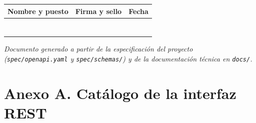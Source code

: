 \documentclass[doc,12pt,a4paper]{apa7}
\renewcommand{\arraystretch}{1.15}}
\begin{document}
\begin{center}
\renewcommand{\arraystretch}{2.2}
\begin{tabular}{|P{5.0cm}|P{5.0cm}|P{4.0cm}|}
\hline
\textbf{Nombre y puesto} & \textbf{Firma y sello} & \textbf{Fecha} \\ \hline
\rule{0pt}{1.4cm} & & \\ \hline
\rule{0pt}{1.4cm} & & \\ \hline
\rule{0pt}{1.4cm} & & \\ \hline
\rule{0pt}{1.4cm} & & \\ \hline
\rule{0pt}{1.4cm} & & \\ \hline
\rule{0pt}{1.4cm} & & \\ \hline
\rule{0pt}{1.4cm} & & \\ \hline
\end{tabular}
\end{center}

\vspace{1.5cm}
\begin{center}
\textit{Documento generado a partir de la especificación del proyecto
(\texttt{spec/openapi.yaml} y \texttt{spec/schemas/}) y de la documentación
técnica en \texttt{docs/}.}
\end{center}

\clearpage
\section*{Anexo A. Catálogo de la interfaz REST}
\end{document}

